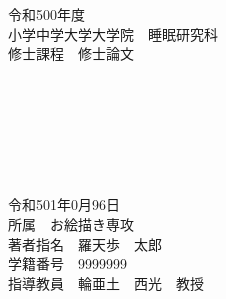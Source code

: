 \documentclass[main]{subfiles}
\begin{document}
\thispagestyle{empty}
\begin{center}

  \vspace{20mm}
  {\Large\noindent 令和500年度}\\
  \vspace{\baselineskip}
  {\Large\noindent 小学中学大学大学院　睡眠研究科}\\
  \vspace{\baselineskip}
  {\Large\noindent 修士課程　修士論文}\\
  \vspace{20mm}
  {\huge{}}\\
  \medskip
  {\huge\noindent{\LaTeX}}\\
  \medskip
  {\huge{}}\\
  \vspace{\baselineskip}
  {\huge{}}\\
  \medskip
  {\huge\noindent{\LaTeX}}\\
  \medskip
  {\huge{}}\\
  \vspace{20mm}

  {\Large\noindent
    令和501年0月96日\\
    \vspace{\baselineskip}
    所属　お絵描き専攻\\
    \vspace{\baselineskip}
    著者指名　羅天歩　太郎\\
    \vspace{\baselineskip}
    学籍番号　9999999\\
    \vspace{\baselineskip}
    指導教員　輪亜土　西光　教授   \\
  }
  \vspace{40mm}

\end{center}

\thispagestyle{empty}
\clearpage
\end{document}
